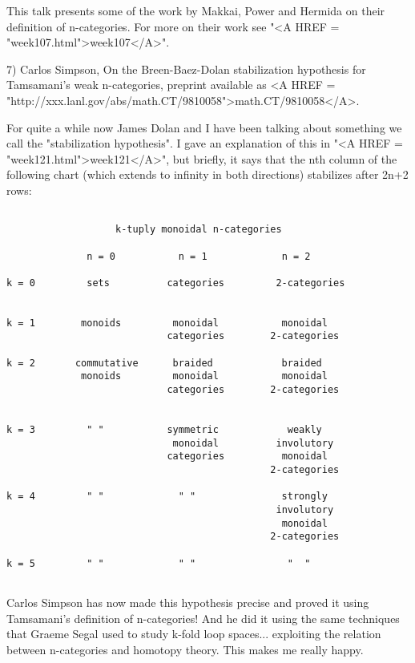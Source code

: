 This talk presents some of the work by Makkai, Power and Hermida on
their definition of n-categories.   For more on their work see "<A HREF = "week107.html">week107</A>".

7) Carlos Simpson, On the Breen-Baez-Dolan stabilization hypothesis for
Tamsamani's weak n-categories, preprint available as 
<A HREF = "http://xxx.lanl.gov/abs/math.CT/9810058">math.CT/9810058</A>.

For quite a while now James Dolan and I have been talking about something
we call the "stabilization hypothesis".  I gave an explanation of this in
"<A HREF = "week121.html">week121</A>", but briefly, it says that the nth column of the following chart
(which extends to infinity in both directions) stabilizes after 2n+2 rows:


\begin{verbatim}

                   k-tuply monoidal n-categories 

              n = 0           n = 1             n = 2

k = 0         sets          categories         2-categories
     

k = 1        monoids         monoidal           monoidal
                            categories        2-categories

k = 2       commutative      braided            braided
             monoids         monoidal           monoidal
                            categories        2-categories 


k = 3         " "           symmetric            weakly
                             monoidal          involutory
                            categories          monoidal
                                              2-categories

k = 4         " "             " "               strongly 
                                               involutory
                                                monoidal
                                              2-categories

k = 5         " "             " "                "  "


\end{verbatim}
    
Carlos Simpson has now made this hypothesis precise and proved it using
Tamsamani's definition of n-categories!  And he did it using the same
techniques that Graeme Segal used to study k-fold loop spaces... 
exploiting the relation between n-categories and homotopy theory.  This 
makes me really happy.

